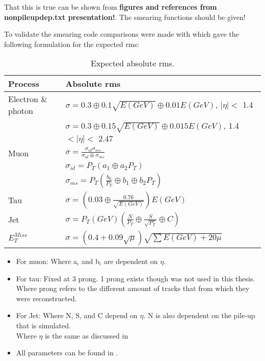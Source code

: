 That this is true can be shown from \textbf{figures and references from nonpileupdep.txt presentation!}. The smearing functions should be given! 

To validate the smearing code comparisons were made with \citep{ATL-PHYS-PUB-2013-004} which gave the following formulation for the expected rms: 
\begin{table}[H]
\renewcommand{\arraystretch}{1.5} %
\begin{center}
\begin{tabular}{|l|l|}
\hline
Process & Absolute rms \\ \hline
Electron \& photon & $\sigma=0.3\oplus 0.1\sqrt{E(GeV)}\oplus 0.01E(GeV)$, $|\eta|<$ 1.4 \\
& $\sigma=0.3\oplus 0.15\sqrt{E(GeV)}\oplus 0.015E(GeV)$, 1.4 $<|\eta|<$ 2.47 \\ \hline 
Muon & $\sigma=\frac{\sigma_{id} \sigma_{ms}}{\sigma_{id} \oplus \sigma_{ms}}$\\
& $\sigma_{id}=P_T(a_1 \oplus a_2 P_T)$\\
& $\sigma_{ms}=P_T(\frac{b_0}{P_T} \oplus b_1 \oplus b_2 P_T)$\\ \hline
Tau & $\sigma =(0.03\oplus \frac{0.76}{\sqrt{E(GeV)}})E(GeV)$ \\ \hline
Jet & $\sigma = P_T(GeV)(\frac{N}{P_T} \oplus \frac{S}{\sqrt{P_T}} \oplus C)$ \\ \hline
$E_T^{Miss}$ & $\sigma = (0.4+0.09\sqrt{\mu})\sqrt{\sum E(GeV)+20\mu}$ \\ \hline
\end{tabular}
\end{center}
\renewcommand{\arraystretch}{1.0} %
\caption{Expected absolute rms.}
\label{tab:expected rms}
\end{table}
\begin{itemize}
\item For muon: Where a$_i$ and b$_i$ are dependent on $\eta$.
\item For tau: Fixed at 3 prong. 1 prong exists though was not used in this thesis. \\
Where prong refers to the different amount of tracks that from which they were reconstructed.
\item For Jet: Where N, S, and C depend on $\eta$. N is also dependent on the pile-up that is simulated.\\
Where $\eta$ is the same as discussed in 
\item All parameters can be found in \citep{ATL-PHYS-PUB-2013-004}.
\end{itemize}
